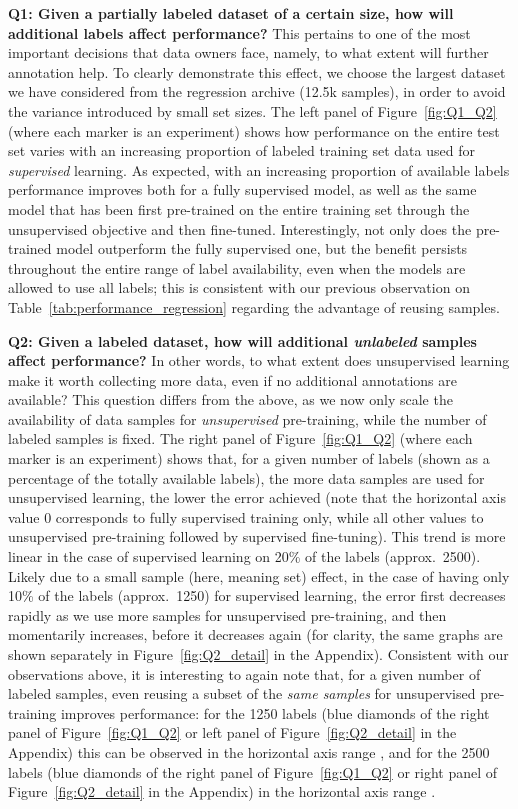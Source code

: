 \documentclass{article} \usepackage{iclr2021_conference,times}
\begin{document}
\textbf{Q1: Given a partially labeled dataset of a certain size, how will additional labels affect performance?} This pertains to one of the most important decisions that data owners face, namely, to what extent will further annotation help. To clearly demonstrate this effect, we choose the largest dataset we have considered from the regression archive (12.5k samples), in order to avoid the variance introduced by small set sizes. The left panel  of Figure~\ref{fig:Q1_Q2} (where each marker is an experiment) shows how performance on the entire test set varies with an increasing proportion of labeled training set data used for \textit{supervised} learning. As expected, with an increasing proportion of available labels performance improves both for a fully supervised model, as well as the same model that has been first pre-trained on the entire training set through the unsupervised objective and then fine-tuned. Interestingly, not only does the pre-trained model outperform the fully supervised one, but the benefit persists throughout the entire range of label availability, even when the models are allowed to use all labels; this is consistent with our previous observation on Table~\ref{tab:performance_regression} regarding the advantage of reusing samples.
    
\textbf{Q2: Given a labeled dataset, how will additional \textit{unlabeled} samples affect performance?} In other words, to what extent does unsupervised learning make it worth collecting more data, even if no additional annotations are available?  
This question differs from the above, as we now only scale the availability of data samples for \textit{unsupervised} pre-training, while the number of labeled samples is fixed. The right panel of Figure~\ref{fig:Q1_Q2} (where each marker is an experiment) shows that, for a given number of labels (shown as a percentage of the totally available labels), the more data samples are used for unsupervised learning, the lower the error achieved (note that the horizontal axis value 0 corresponds to fully supervised training only, while all other values to unsupervised pre-training followed by supervised fine-tuning). This trend is more linear in the case of supervised learning on 20\% of the labels (approx.\ 2500). Likely due to a small sample (here, meaning set) effect, in the case of having only 10\% of the labels (approx.\ 1250) for supervised learning, the error first decreases rapidly as we use more samples for unsupervised pre-training, and then momentarily increases, before it decreases again (for clarity, the same graphs are shown separately in Figure~\ref{fig:Q2_detail} in the Appendix).
Consistent with our observations above, it is interesting to again note that, for a given number of labeled samples, even reusing a subset of the \textit{same samples} for unsupervised pre-training improves performance: for the 1250 labels (blue diamonds of the right panel of Figure~\ref{fig:Q1_Q2} or left panel of Figure~\ref{fig:Q2_detail} in the Appendix) this can be observed in the horizontal axis range , and for the 2500 labels (blue diamonds of the right panel of Figure~\ref{fig:Q1_Q2} or right panel of Figure~\ref{fig:Q2_detail} in the Appendix) in the horizontal axis range .
\end{document}
